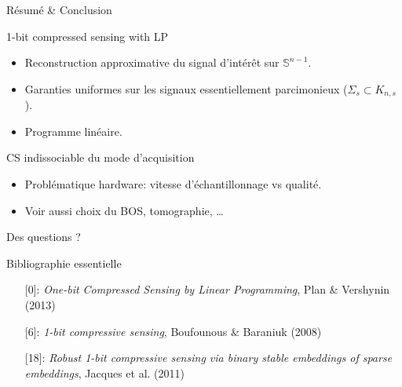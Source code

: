 \documentclass[10pt, aspectratio=169]{beamer}
\begin{document}
\begin{frame}{Résumé \& Conclusion}

\begin{block}{1-bit compressed sensing with LP}
\smallskip

\begin{itemize}
    \item Reconstruction approximative du signal d'intérêt sur $\mathbb{S}^{n-1}$.
    \item Garanties uniformes sur les signaux essentiellement parcimonieux ($\Sigma_s \subset K_{n,s}$).
    \item Programme linéaire.
\end{itemize}

\end{block}
\begin{block}{CS indissociable du mode d'acquisition}
\smallskip

\begin{itemize}
    \item Problématique hardware: vitesse d'échantillonnage vs qualité.
    \item Voir aussi choix du BOS, tomographie, \ldots
\end{itemize}
\end{block}
\end{frame}

\begin{frame}[standout]{}
    Des questions ?
\end{frame}

\begin{frame}{Bibliographie essentielle}

\begin{itemize}
    \item[] [0]: \emph{One-bit Compressed Sensing by Linear Programming}, Plan \& Vershynin (2013)
    \item[] [6]: \emph{1-bit compressive sensing}, Boufounous \& Baraniuk (2008)
    \item[] [18]: \emph{Robust 1-bit compressive sensing via binary stable embeddings of sparse embeddings}, Jacques et al. (2011)
\end{itemize}

\end{frame}
\end{document}
